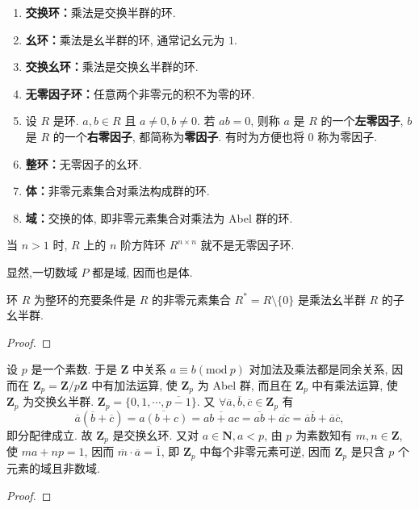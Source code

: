 \documentclass[../../main.tex]{subfiles}
\begin{document}
\begin{definition}
\begin{enumerate}
\item \textbf{交换环：}乘法是交换半群的环.

\item \textbf{幺环：}乘法是幺半群的环, 通常记幺元为 \( 1 \).

\item \textbf{交换幺环：}乘法是交换幺半群的环.

\item \textbf{无零因子环：}任意两个非零元的积不为零的环.

\item 设 \( R \) 是环. \( a,b \in R \) 且 \( a \neq 0, b \neq 0 \). 若 \( ab = 0 \), 则称 \( a \) 是 \( R \) 的一个\textbf{左零因子}, \( b \) 是 \( R \) 的一个\textbf{右零因子}, 都简称为\textbf{零因子}. 有时为方便也将 \( 0 \) 称为零因子. 
\item \textbf{整环：}无零因子的幺环.

\item \textbf{体：}非零元素集合对乘法构成群的环.

\item \textbf{域：}交换的体, 即非零元素集合对乘法为 Abel 群的环.
\end{enumerate}
\end{definition}
\begin{remark}
当 \( n > 1 \) 时, \( R \) 上的 \( n \) 阶方阵环 \( R^{n \times n} \) 就不是无零因子环.

显然,一切数域 \( P \) 都是域, 因而也是体.
\end{remark}

\begin{proposition}
环 \( R \) 为整环的充要条件是 \( R \) 的非零元素集合 \( R^* = R \setminus \{0\} \) 是乘法幺半群 \( R \) 的子幺半群.
\end{proposition}
\begin{proof}

\end{proof}

\begin{example}
设 \( p \) 是一个素数. 于是 \( \mathbf{Z} \) 中关系 \( a \equiv b(\text{mod}\ p) \) 对加法及乘法都是同余关系, 因而在 \( \mathbf{Z}_p = \mathbf{Z}/p\mathbf{Z} \) 中有加法运算, 使 \( \mathbf{Z}_p \) 为 Abel 群, 而且在 \( \mathbf{Z}_p \) 中有乘法运算, 使 \( \mathbf{Z}_p \) 为交换幺半群. \( \mathbf{Z}_p = \{0,1,\cdots,\overline{p-1}\} \). 又 \( \forall \overline{a},\overline{b},\overline{c} \in \mathbf{Z}_p \) 有
\[
\overline{a}(\overline{b} + \overline{c}) = \overline{a(b + c)} = \overline{ab + ac} = \overline{ab} + \overline{ac} = \overline{a}\overline{b} + \overline{a}\overline{c},
\]
即分配律成立. 故 \( \mathbf{Z}_p \) 是交换幺环. 又对 \( a \in \mathbf{N}, a < p \), 由 \( p \) 为素数知有 \( m,n \in \mathbf{Z} \), 使 \( ma + np = 1 \), 因而 \( \overline{m} \cdot \overline{a} = \overline{1} \), 即 \( \mathbf{Z}_p \) 中每个非零元素可逆, 因而 \( \mathbf{Z}_p \) 是只含 \( p \) 个元素的域且非数域.
\end{example}
\begin{proof}

\end{proof}
\end{document}

